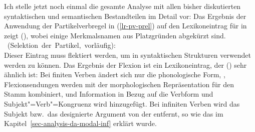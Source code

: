 Ich stelle jetzt noch einmal die gesamte Analyse mit allen bisher diskutierten syntaktischen
und semantischen Bestandteilen im Detail vor: Das Ergebnis der Anwendung der Partikelverbregel in (\ref{lr-pv-prel})
auf den Lexikoneintrag für  in  zeigt (), wobei einige
Merkmalsnamen aus Platzgründen abgekürzt sind.
%
\newsavebox{\boxxcomp}
%
\eas
\label{le-lach-+particle-prel}
\mbox{ (Selektion der Partikel, vorläufig):}\\
\zs
%
Dieser Eintrag muss flektiert werden, um in syntaktischen Strukturen verwendet werden zu können.
Das Ergebnis der Flexion ist ein Lexikoneintrag, der () sehr ähnlich ist: Bei finiten
Verben ändert sich nur die phonologische Form, \dash, Flexionsendungen werden mit der morphologischen
Repräsentation für den Stamm kombiniert, und Information in Bezug auf die Verbform und Subjekt"=Verb"=Kongruenz
wird hinzugefügt. Bei infiniten Verben wird das Subjekt bzw.\ das designierte Argument
von der \compsl entfernt, so wie das im Kapitel~\ref{sec-analysis-da-modal-inf} erklärt wurde.
 

